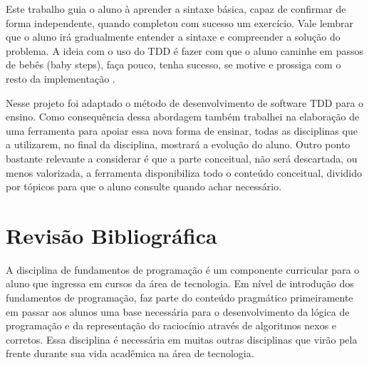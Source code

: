 \documentclass[pnumabnt,normaltoc,espacoumemeio,capchap]{abnt}
\begin{document}
\par Este trabalho guia o aluno à aprender a sintaxe básica, capaz de confirmar de forma independente, quando completou com sucesso um exercício. Vale lembrar que o aluno irá gradualmente entender a sintaxe e compreender a solução do problema. A ideia com o uso do TDD é fazer com que o aluno caminhe em passos de bebês (baby steps), faça pouco, tenha sucesso, se motive e prossiga com o resto da implementação \cite{TF12}.
\par Nesse projeto foi adaptado o método de desenvolvimento de software TDD para o ensino. Como consequência dessa abordagem também trabalhei na elaboração de uma ferramenta para apoiar essa nova forma de ensinar, todas as disciplinas que a utilizarem, no final da disciplina, mostrará a evolução do aluno. Outro ponto bastante relevante a considerar é que a parte conceitual, não será descartada, ou menos valorizada, a ferramenta disponibiliza todo o conteúdo conceitual, dividido por tópicos para que o aluno consulte quando achar necessário.


\chapter{Revisão Bibliográfica}
\par A disciplina de fundamentos de programação é um componente curricular para o aluno que ingressa em cursos da área de tecnologia. Em nível de introdução dos fundamentos de programação, faz parte do conteúdo pragmático primeiramente em passar aos alunos uma base necessária para o desenvolvimento da lógica de programação e da representação do raciocínio através de algoritmos nexos e corretos. Essa disciplina é necessária em muitas outras disciplinas que virão pela frente durante sua vida acadêmica na área de tecnologia.
\end{document}
